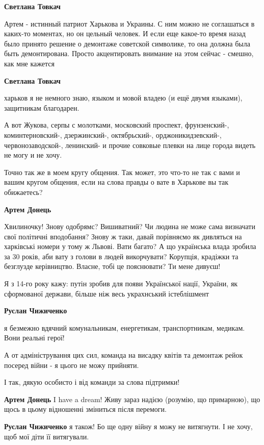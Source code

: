 \begin{itemize}
\begin{itemize}
\textbf{Светлана Товкач} 

Артем - истинный патриот Харькова и Украины. С ним можно не соглашаться в
каких-то моментах, но он цельный человек. И если еще какое-то время назад было
принято решение о демонтаже советской символике, то она должна была быть
демонтирована. Просто акцентировать внимание на этом сейчас - смешно, как мне
кажется

\textbf{Светлана Товкач} 

харьков я не немного знаю, языком и мовой владею (и ещё двумя языками),
защитникам благодарен.

А вот Жукова, серпы с молотками, московский проспект, фрунзенский-,
коминтерновский-, дзержинский-, октябрьский-, орджоникидзевский-,
червонозаводской-, ленинский- и прочие совковые плевки на лице города видеть не
могу и не хочу.

Точно так же в моем кругу общения. Так может, это что-то не так с вами и вашим
кругом общения, если на слова правды о вате в Харькове вы так обижаетесь?

\textbf{Артем Донець} 

Хвилиночку! Знову одобрямс? Вишиватний? Чи людина не може сама визначати свої
політичні вподобання? Знову ж таки, давай порівняємо як дивляться на харківські
номери у тому ж Львові. Вати багато? А що українська влада зробила за 30 років,
аби вату з голови в людей викорчувати? Корупція, крадіжки та безглузде
керівництво. Власне, тобі це пояснювати? Ти мене дивуєш!

Я з 14-го року кажу: путін зробив для появи Української нації, України, як
сформованої держави, більше ніж весь украхнський істеблішмент

\textbf{Руслан Чижиченко} 

я безмежно вдячний комунальникам, енергетикам, транспортникам, медикам. Вони
реальні герої!

А от адміністрування цих сил, команда на висадку квітів та демонтаж рейок
посеред війни - я цього не можу прийняти.

І так, дякую особисто і від команди за слова підтримки!

\textbf{Артем Донець} I have a dream! Живу зараз надією (розумію, що примарною), що щось в цьому відношенні зміниться після перемоги.

\textbf{Руслан Чижиченко} я також!
Бо ще одну війну я можу не витягнути.
І не хочу, щоб мої діти її витягували.


\end{itemize}
\end{itemize}
